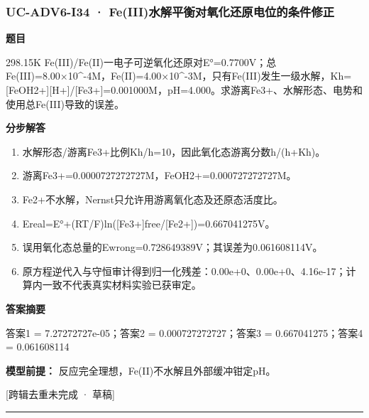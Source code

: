 \documentclass[UTF8,11pt,a4paper]{ctexart}
\begin{document}
\subsubsection*{UC-ADV6-I34 · Fe(III)水解平衡对氧化还原电位的条件修正}
\noindent\textbf{题目}\par
298.15K Fe(III)/Fe(II)一电子可逆氧化还原对E°=0.7700V；总Fe(III)=8.00×10\textasciicircum{}-4M，Fe(II)=4.00×10\textasciicircum{}-3M，只有Fe(III)发生一级水解，Kh=[FeOH2+][H+]/[Fe3+]=0.001000M，pH=4.000。求游离Fe3+、水解形态、电势和使用总Fe(III)导致的误差。\par
\medskip\noindent\textbf{分步解答}
\begin{enumerate}
\item 水解形态/游离Fe3+比例Kh/h=10，因此氧化态游离分数h/(h+Kh)。
\item 游离Fe3+=0.0000727272727M，FeOH2+=0.000727272727M。
\item Fe2+不水解，Nernst只允许用游离氧化态及还原态活度比。
\item Ereal=E°+(RT/F)ln([Fe3+]free/[Fe2+])=0.667041275V。
\item 误用氧化态总量的Ewrong=0.728649389V；其误差为0.061608114V。
\item 原方程逆代入与守恒审计得到归一化残差：0.00e+0、0.00e+0、4.16e-17；计算内一致不代表真实材料实验已获审定。
\end{enumerate}
\noindent\textbf{答案摘要}\par
答案1 = 7.27272727e-05；答案2 = 0.000727272727；答案3 = 0.667041275；答案4 = 0.061608114\par
\noindent\textbf{模型前提：}
反应完全理想，Fe(II)不水解且外部缓冲钳定pH。\par
\noindent\textcolor{red!65!black}{[跨辑去重未完成 · 草稿]} \par
\medskip\hrule\medskip
{}
\end{document}
